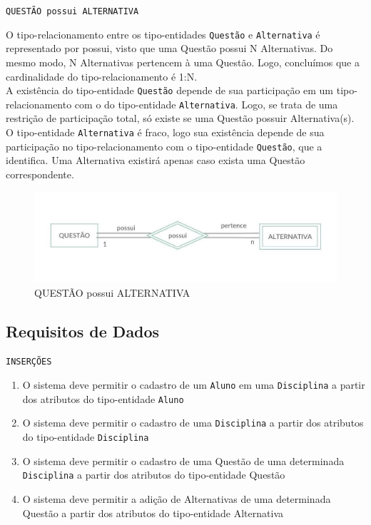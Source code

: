 \documentclass[12pt,a4paper]{article}
\begin{document}
\begin{center}
    \texttt{QUESTÃO \texttt{possui} ALTERNATIVA}
\end{center}

O tipo-relacionamento entre os tipo-entidades \texttt{Questão} e \texttt{Alternativa} é representado por possui, visto que uma Questão possui N Alternativas. Do mesmo modo, N Alternativas pertencem à uma Questão. Logo, concluímos que a cardinalidade do tipo-relacionamento é 1:N.\\

A existência do tipo-entidade \texttt{Questão} depende de sua participação em um tipo-relacionamento com o do tipo-entidade  {\texttt{Alternativa}}. Logo, se trata de uma restrição de participação total, só existe se uma Questão possuir Alternativa(s).\\

O tipo-entidade \texttt{Alternativa} é fraco, logo sua existência depende de sua participação no tipo-relacionamento com o tipo-entidade \texttt{Questão}, que a identifica. Uma Alternativa existirá apenas caso exista uma Questão correspondente.\\

\begin{center}
\begin{figure}[h]
    \centering
    \includegraphics[width=\linewidth]{questaoAlternativa.jpg}
    \caption{QUESTÃO possui ALTERNATIVA}
    \label{fig:questaoAlternativa}
\end{figure}
\end{center}

\pagebreak
\subsection{Requisitos de Dados}

\vspace{0.5cm}
\begin{center}
    \texttt{INSERÇÕES}
\end{center}
\begin{enumerate}
    \item O sistema deve permitir o cadastro de um \texttt{Aluno} em uma \texttt{Disciplina} a partir dos atributos do tipo-entidade \texttt{Aluno}
    \item O sistema deve permitir o cadastro de uma \texttt{Disciplina} a partir dos atributos do tipo-entidade \texttt{Disciplina}
    \item O sistema deve permitir o cadastro de uma Questão de uma determinada \texttt{Disciplina} a partir dos atributos do tipo-entidade Questão
    \item O sistema deve permitir a adição de Alternativas de uma determinada Questão a partir dos atributos do tipo-entidade Alternativa
\end{enumerate}
\end{document}
